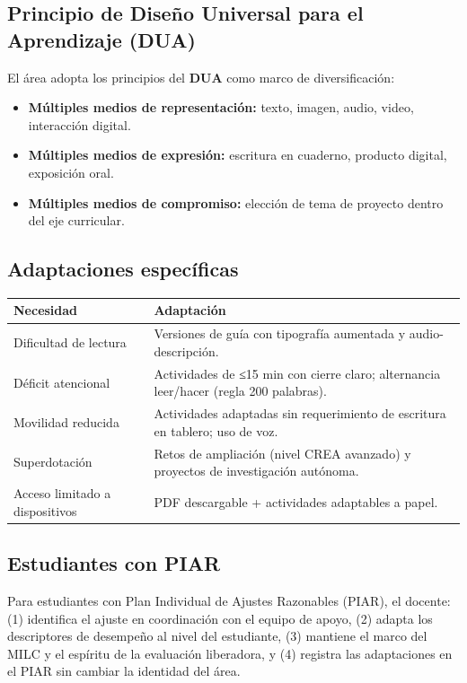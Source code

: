 \documentclass[12pt, a4paper]{article}
\begin{document}
\subsection{Principio de Diseño Universal para el Aprendizaje (DUA)}

El área adopta los principios del \textbf{DUA} como marco de diversificación:

\begin{itemize}
  \item \textbf{Múltiples medios de representación:} texto, imagen, audio, video, interacción digital.
  \item \textbf{Múltiples medios de expresión:} escritura en cuaderno, producto digital, exposición oral.
  \item \textbf{Múltiples medios de compromiso:} elección de tema de proyecto dentro del eje curricular.
\end{itemize}

\subsection{Adaptaciones específicas}

\begin{center}
\begin{tabular}{|L{4cm}|L{10cm}|}
\hline
{}
\color{white}\textbf{Necesidad} & \color{white}\textbf{Adaptación} \\
\hline
Dificultad de lectura &
Versiones de guía con tipografía aumentada y audio-descripción. \\
\hline
Déficit atencional &
Actividades de ≤15 min con cierre claro; alternancia leer/hacer (regla 200 palabras). \\
\hline
Movilidad reducida &
Actividades adaptadas sin requerimiento de escritura en tablero; uso de voz. \\
\hline
Superdotación &
Retos de ampliación (nivel CREA avanzado) y proyectos de investigación autónoma. \\
\hline
Acceso limitado a dispositivos &
PDF descargable + actividades adaptables a papel. \\
\hline
\end{tabular}
\end{center}

\subsection{Estudiantes con PIAR}

Para estudiantes con Plan Individual de Ajustes Razonables (PIAR), el docente:
(1) identifica el ajuste en coordinación con el equipo de apoyo,
(2) adapta los descriptores de desempeño al nivel del estudiante,
(3) mantiene el marco del MILC y el espíritu de la evaluación liberadora, y
(4) registra las adaptaciones en el PIAR sin cambiar la identidad del área.
\end{document}
